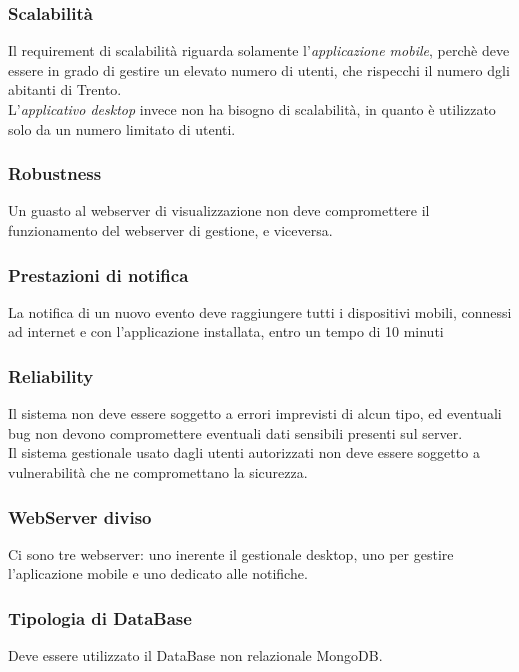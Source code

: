 \documentclass{article}
\begin{document}
\subsubsection{Scalabilità}
Il requirement di scalabilità riguarda solamente l'\textit{applicazione mobile}, perchè deve essere in grado di gestire un elevato numero di utenti, che rispecchi il numero dgli abitanti di Trento.\\
L'\textit{applicativo desktop} invece non ha bisogno di scalabilità, in quanto è utilizzato solo da un numero limitato di utenti.

\subsubsection{Robustness}
Un guasto al webserver di visualizzazione non deve compromettere il funzionamento del webserver di gestione, e viceversa.

\subsubsection{Prestazioni di notifica}
La notifica di un nuovo evento deve raggiungere tutti i dispositivi mobili, connessi ad internet e con l'applicazione installata, entro un tempo di 10 minuti

\subsubsection{Reliability}
Il sistema non deve essere soggetto a errori imprevisti di alcun tipo, ed eventuali bug non devono compromettere eventuali dati sensibili presenti sul server.\\
Il sistema gestionale usato dagli utenti autorizzati non deve essere soggetto a vulnerabilità che ne compromettano la sicurezza. 

\subsubsection{WebServer diviso}
Ci sono tre webserver: uno inerente il gestionale desktop, uno per gestire l'aplicazione mobile e uno dedicato alle notifiche.

\subsubsection{Tipologia di DataBase}
Deve essere utilizzato il DataBase non relazionale MongoDB.
\end{document}
